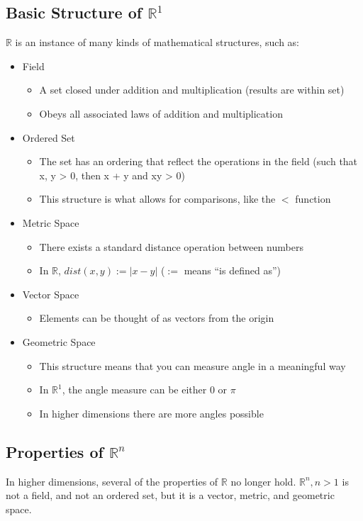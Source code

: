 \documentclass[11 pt, twoside]{article}
\begin{document}
\subsection{Basic Structure of $\mathbb{R}^1$}
$\mathbb{R}$ is an instance of many kinds of mathematical structures, such as:
\begin{itemize}
\item Field
\begin{itemize}
\item A set closed under addition and multiplication (results are within set)
\item Obeys all associated laws of addition and multiplication
\end{itemize}
\item Ordered Set
\begin{itemize}
\item The set has an ordering that reflect the operations in the
field (such that x, y > 0, then x + y and  xy > 0)
\item This structure is what allows for comparisons, like the $<$
function
\end{itemize}
\item Metric Space
\begin{itemize}
\item There exists a standard distance operation between numbers
\item In $\mathbb{R}$, $dist(x, y) := |x - y|$ ($:=$ means ``is
defined as'')
\end{itemize}
\item Vector Space
\begin{itemize}
\item Elements can be thought of as vectors from the origin
\end{itemize}
\item Geometric Space
\begin{itemize}
\item This structure means that you can measure angle in a meaningful way
\item In $\mathbb{R}^1$, the angle measure can be either $0$ or $\pi$
\item In higher dimensions there are more angles possible
\end{itemize}
\end{itemize}

\subsection{Properties of $\mathbb{R}^n$}
In higher dimensions, several of the properties of $\mathbb{R}$ no longer hold.
$\mathbb{R}^n, n > 1$ is not a field, and not an ordered set, but it is a vector, metric, and geometric space.
\end{document}

